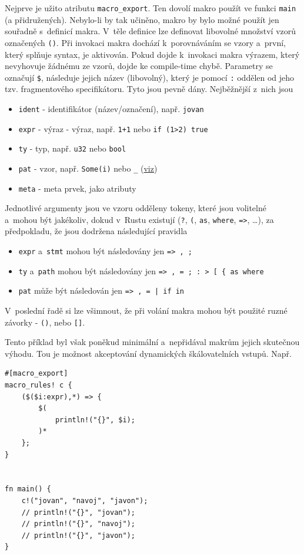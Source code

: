 \documentclass[a4paper, 12pt]{article} %
\newcommand{\rust}[1]{\texttt{#1}}
\begin{document}
			Nejprve je užito atributu \rust{macro_export}. Ten dovolí makro použít ve funkci \rust{main} (a přidružených). Nebylo-li by tak učiněno, makro by bylo možné použít jen souřadně s~definicí makra. V~těle definice lze definovat libovolné množství vzorů označených \rust{()}. Při invokaci makra dochází k~porovnáváním se vzory a~první, který splňuje syntax, je aktivován. Pokud dojde k~invokaci makra výrazem, který nevyhovuje žádnému ze vzorů, dojde ke compile-time chybě. Parametry se označují \texttt{\$}, následuje jejich název (libovolný), který je pomocí \texttt{:} oddělen od jeho tzv. fragmentového specifikátoru. Tyto jsou pevně dány. Nejběžnější z~nich jsou
			\begin{itemize}
				\item \rust{ident} - identifikátor (název/označení), např. \rust{jovan}
				\item \rust{expr}  - výraz - výraz, např. \rust{1+1} nebo \rust{if (1>2) {true}}
				\item \rust{ty}    - typ, např. \rust{u32} nebo \rust{bool}
				\item \rust{pat}   - vzor, např. \rust{Some(i)} nebo \rust{_} (\hyperlink{_}{viz})
				\item \rust{meta}  - meta prvek, jako atributy
			\end{itemize}\cite{makra}
			
			Jednotlivé argumenty jsou ve vzoru odděleny tokeny, které jsou volitelné a~mohou být jakékoliv, dokud v~Rustu existují (\rust{?}, \rust{(}, \rust{as}, \rust{where}, \rust{=>}, \dots), za předpokladu, že jsou dodržena následující pravidla
			\begin{itemize}
				\item \rust{expr} a~\rust{stmt} mohou být následovány jen \texttt{=> , ;}
				\item \rust{ty} a~\rust{path} mohou být následovány jen \texttt{=> , = ; : > [ \{ as where}
				\item \rust{pat} může být následován jen \texttt{=> , = | if in}
			\end{itemize}
			
			V~poslední řadě si lze všimnout, že při volání makra mohou být použité ruzné závorky - \rust{()}, \rust{{}} nebo \rust{[]}.
			
			Tento příklad byl však poněkud minimální a~nepřidával makrům jejich skutečnou výhodu. Tou je možnost akceptování dynamických škálovatelních vstupů. Např.
			\begin{verbatim}
#[macro_export]
macro_rules! c {
	($($i:expr),*) => { 
		$(
			println!("{}", $i);
		)*
	};
}


fn main() {
	c!("jovan", "navoj", "javon");
	// println!("{}", "jovan");
	// println!("{}", "navoj");
	// println!("{}", "javon");
}
			\end{verbatim}
			
\end{document}
